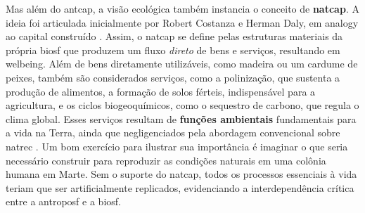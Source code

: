 \documentclass[./main.tex]{subfiles}
\begin{document}
\par Mas além do \gls{antcap}, a visão ecológica também instancia o conceito de \textbf{\gls{natcap}}. A ideia foi articulada inicialmente por Robert Costanza e Herman Daly, em \gls{analogy} ao capital construído \cite{Costanza1992a}. Assim, o \gls{natcap} se define pelas estruturas materiais da própria \gls{biosf} que produzem um fluxo \textit{direto} de bens e serviços, resultando em \gls{welbeing}. Além de bens diretamente utilizáveis, como madeira ou um cardume de peixes, também são considerados serviços, como a polinização, que sustenta a produção de alimentos, a formação de solos férteis, indispensável para a agricultura, e os ciclos biogeoquímicos, como o sequestro de carbono, que regula o clima global. Esses serviços resultam de \textbf{funções ambientais} fundamentais para a vida na Terra, ainda que negligenciados pela abordagem convencional sobre \gls{natrec} \cite{Groot1987a}. Um bom exercício para ilustrar sua importância é imaginar o que seria necessário construir para reproduzir as condições naturais em uma colônia humana em Marte. Sem o suporte do \gls{natcap}, todos os processos essenciais à vida teriam que ser artificialmente replicados, evidenciando a interdependência crítica entre a \gls{antroposf} e a \gls{biosf}.
\end{document}
